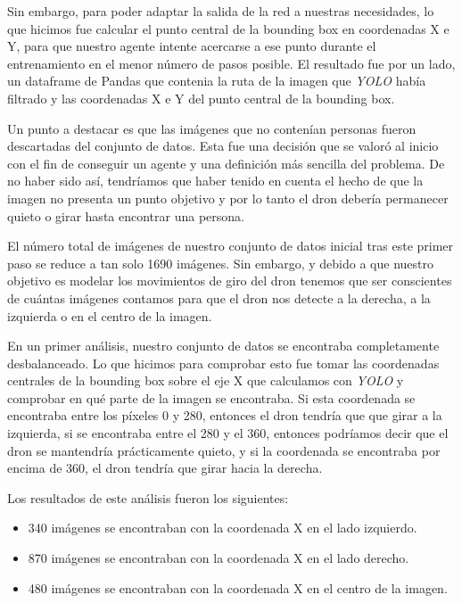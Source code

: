 Sin embargo, para poder adaptar la salida de la red a nuestras necesidades, lo que hicimos fue calcular el punto central de la bounding box en coordenadas X e Y, para que nuestro agente intente acercarse a ese punto durante el entrenamiento en el menor número de pasos posible.
El resultado fue por un lado, un dataframe de Pandas que contenia la ruta de la imagen que \textit{YOLO} había filtrado y las coordenadas X e Y del punto central de la bounding box.
\medskip

Un punto a destacar es que las imágenes que no contenían personas fueron descartadas del conjunto de datos. Esta fue una decisión que se valoró al inicio con el fin de conseguir un agente y una definición más sencilla del problema. De no haber sido así, tendríamos que haber tenido en cuenta el hecho de que la imagen no presenta un punto objetivo y por lo tanto el dron debería permanecer quieto o girar hasta encontrar una persona.
\medskip

El número total de imágenes de nuestro conjunto de datos inicial tras este primer paso se reduce a tan solo 1690 imágenes. Sin embargo, y debido a que nuestro objetivo es modelar los movimientos de giro del dron tenemos que ser conscientes de cuántas imágenes contamos para que el dron nos detecte a la derecha, a la izquierda o en el centro de la imagen.
\medskip

En un primer análisis, nuestro conjunto de datos se encontraba completamente desbalanceado. Lo que hicimos para comprobar esto fue tomar las coordenadas centrales de la bounding box sobre el eje X que calculamos con \textit{YOLO} y comprobar en qué parte de la imagen se encontraba. Si esta coordenada se encontraba entre los píxeles 0 y 280, entonces el dron tendría que que girar a la izquierda, si se encontraba entre el 280 y el 360, entonces podríamos decir que el dron se mantendría prácticamente quieto, y si la coordenada se encontraba por encima de 360, el dron tendría que girar hacia la derecha.
\medskip

Los resultados de este análisis fueron los siguientes:

\begin{itemize}
    \item 340 imágenes se encontraban con la coordenada X en el lado izquierdo.
    \item 870 imágenes se encontraban con la coordenada X en el lado derecho.
    \item 480 imágenes se encontraban con la coordenada X en el centro de la imagen.
\end{itemize}

